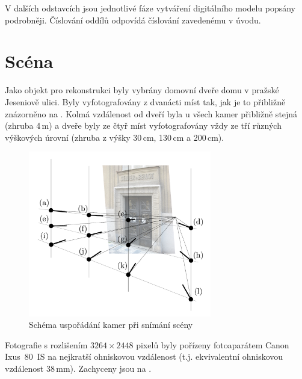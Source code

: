 \documentclass[11pt,oneside,a4paper,pdftex]{article}   %
\begin{document}
	V dalších odstavcích jsou jednotlivé fáze vytváření digitálního modelu popsány po\-drob\-ně\-ji. Číslování
	oddílů odpovídá číslování zavedenému v úvodu.


\section{Scéna}

	Jako objekt pro rekonstrukci byly vybrány domovní dveře domu v pražské Jeseniově ulici. Byly
	vyfotografovány z dvanácti míst tak, jak je to přibližně znázorněno na .
	Kolmá vzdálenost od dveří byla u všech kamer přibližně stejná (zhruba 4\,m) a dveře byly ze čtyř
	míst vyfotografovány vždy ze tří různých výškových úrovní (zhruba z výšky 30\,cm, 130\,cm a
	200\,cm).
		\begin{figure}[htb]
			\centering
			\includegraphics[width=8cm]{pictures/usporadani_kamer.pdf}
			\caption{Schéma uspořádání kamer při snímání scény}
			\label{figUsporadaniKamer}
		\end{figure}
	Fotografie s rozlišením $3264\times2448$ pixelů byly pořízeny fotoaparátem Canon Ixus~80~IS na
	nejkratší ohniskovou vzdálenost (t.j. ekvivalentní ohniskovou vzdálenost 38\,mm). Zachyceny
	jsou na .
\end{document}
